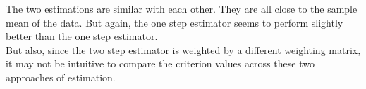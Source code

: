 \documentclass[letterpaper,12pt]{article}
\theoremstyle{definition}
\numberwithin{equation}{section}
\begin{document}
\begin{enumerate} [\bfseries (a)]
The two estimations are similar with each other. They are all close to the sample mean of the data. But again, the one step estimator seems to perform slightly better than the one step estimator. \\
But also, since the two step estimator is weighted by a different weighting matrix, it may not be intuitive to compare the criterion values across these two approaches of estimation.

\end{enumerate}
\end{document}
